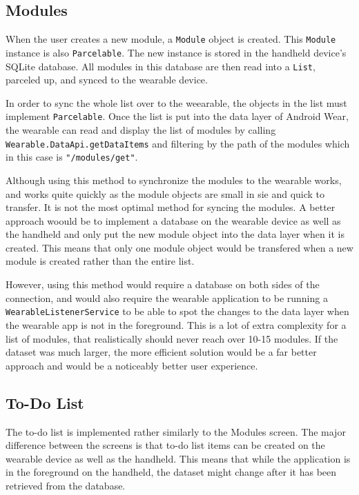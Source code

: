 \subsection{Modules}
When the user creates a new module, a \texttt{Module} object is created. This
\texttt{Module} instance is also \texttt{Parcelable}. The new instance is stored
in the handheld device's SQLite database. All modules in this database are then
read into a \texttt{List}, parceled up, and synced to the wearable device.

In order to sync the whole list over to the weearable, the objects in the list
must implement \texttt{Parcelable}. Once the list is put into the data layer of
Android Wear, the wearable can read and display the list of modules by calling
\texttt{Wearable.DataApi.getDataItems} and filtering by the path of the modules
which in this case is \texttt{"/modules/get"}.

Although using this method to synchronize the modules to the wearable works,
and works quite quickly as the module objects are small in sie and quick to
transfer. It is not the most optimal method for syncing the modules. A better
approach woould be to implement a database on the wearable device as well as the
handheld and only put the new module object into the data layer when it is
created. This means that only one module object would be transfered when a new
module is created rather than the entire list.

However, using this method would require a database on both sides of the
connection, and would also require the wearable application to be running a
\texttt{WearableListenerService} to be able to spot the changes to the data
layer when the wearable app is not in the foreground. This is a lot of extra
complexity for a list of modules, that realistically should never reach over
10-15 modules. If the dataset was much larger, the more efficient solution
would be a far better approach and would be a noticeably better user experience.

\subsection{To-Do List}
The to-do list is implemented rather similarly to the Modules screen. The major
difference between the screens is that to-do list items can be created on the
wearable device as well as the handheld. This means that while the application
is in the foreground on the handheld, the dataset might change after it has been
retrieved from the database.

